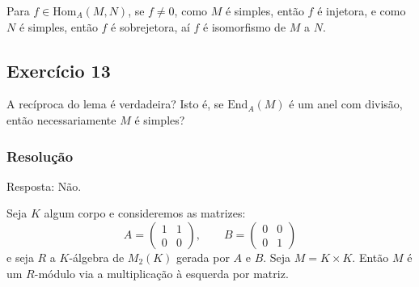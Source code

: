 \documentclass[10pt,a4paper]{article}
\begin{document}
Para $f\in\mathrm{Hom}_A(M,N)$, se $f\neq 0$, como $M$ é simples, então $f$ é injetora, e como $N$ é simples, então $f$ é sobrejetora, aí $f$ é isomorfismo de $M$ a $N$.

\subsection*{Exercício 13}

A recíproca do lema é verdadeira? Isto é, se $\mathrm{End}_A(M)$ é um anel com divisão, então necessariamente $M$ é simples?

\subsubsection*{Resolução}

Resposta: Não.

\medskip
\noindent
Seja $K$ algum corpo e consideremos as matrizes:
\[
A=\begin{pmatrix}
1&1\\0&0
\end{pmatrix},\quad\quad B=\begin{pmatrix}
0&0\\0&1
\end{pmatrix}
\]
e seja $R$ a $K$-álgebra de $M_2(K)$ gerada por $A$ e $B$. Seja $M=K\times K$. Então $M$ é um $R$-módulo via a multiplicação à esquerda por matriz.
\end{document}
